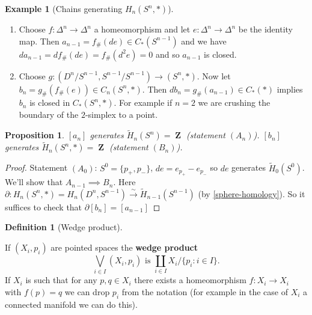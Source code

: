 \documentclass[10pt,]{book}
\newcommand{\terminology}[1]{\textbf{#1}}
\theoremstyle{plain}
\newtheorem{proposition}[theorem]{Proposition}
\theoremstyle{definition}
\newtheorem{definition}[theorem]{Definition}
\newtheorem{example}[theorem]{Example}
\numberwithin{equation}{section}
\DeclareMathOperator{\ZZ}{\mathbf{Z}}
\begin{document}
\begin{example}[Chains generating \(H_n(S^n, *)\)]\label{example-13}
\begin{enumerate}
\item{}
                  Choose \(f\colon \Delta^n \to \Delta^n\) a homeomorphism and let \(e\colon \Delta^n \to \Delta^n\) be the identity map.
                  Then \(a_{n-1} = f_\#(de) \in C_*(S^{n-1})\) and we have \(d a_{n-1} = df_\#(de) = f_\# (d^2 e) = 0\) and so \(a_{n-1}\) is closed.
                \item{}
                  Choose \(g\colon (D^n/S^{n-1}, S^{n-1}/S^{n-1}) \to (S^n, *)\).
                  Now let \(b_n = g_\#(f_\#(e)) \in C_n(S^n,*)\).
                  Then \(db_n = g_\#(a_{n-1}) \in C_*(*)\) implies \(b_n\) is closed in \(C_*(S^n, *)\).
                  \newline{}
                  For example if \(n = 2\) we are crushing the boundary of the \(2\)-simplex to a point.
                \end{enumerate}
\end{example}
\begin{proposition}\label{proposition-4}
\([a_n]\) generates \(\tilde H_n(S^n) = \ZZ\) (statement \((A_n)\)). \newline{}\([b_n]\) generates \(\tilde H_n(S^n, *) = \ZZ\) (statement \((B_n)\)). \newline{}\end{proposition}
\begin{proof}

              Statement \((A_0)\): \(S^0 = \{p_+, p_-\}\), \(de = e_{p_+} - e_{p_-}\) so \(de\) generates \(\tilde H_0(S^0)\).\newline{}
              We'll show that \(A_{n-1}\implies B_n\).
              Here \(\partial\colon H_n(S^n, *)=H_n(D^n, S^{n-1}) \xrightarrow{\sim} \tilde H_{n-1}(S^{n-1})\) (by \ref{sphere-homology}).
              So it suffices to check that \(\partial [b_n] = [a_{n-1}]\)\end{proof}
\begin{definition}[Wedge product]\label{definition-17}

              If \((X_i, p_i)\) are pointed spaces the \terminology{wedge product}\[
                \bigvee_{i\in I} (X_i,p_i) \text{ is } \coprod_{i\in I} X_i\Big/\{p_i : i\in I\}.
              \]
              If \(X_i\) is such that for any \(p,q\in X_i\) there exists a homeomorphism \(f\colon X_i \to X_i\) with \(f(p) = q\) we can drop \(p_i\) from the notation (for example in the case of \(X_i\) a connected manifold we can do this).
            \end{definition}
\end{document}
